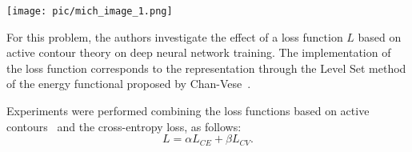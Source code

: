 \documentclass[twocolumn]{article}
\newcommand{\PUCP}[0]{PUCP}\newcommand{\HCMUS}[0]{HCMUS}\newcommand{\baseline}[0]{Baseline}
\begin{document}
\begin{figure*}[t]
\centering
\texttt{[image: pic/mich\_image\_1.png]}
\caption{Overview of the \PUCP{} method}
\label{fig:mich}
\end{figure*}

For this problem, the authors investigate the effect of a loss function $L$ based on active contour theory on deep neural network training. The implementation of the loss function corresponds to the representation through the Level Set method of the energy functional proposed by Chan-Vese~\cite{mich_1}. 

Experiments were performed combining the loss functions based on active contours~\cite{mich_2,mich_3,mich_4} and the cross-entropy loss, as follows:
\begin{equation}
    L=\alpha L_{CE} + \beta L_{CV}.
\label{eq1}\end{equation}
\end{document}

